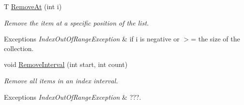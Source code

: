 \begin{DoxyCompactItemize}
T \hyperlink{class_c5_1_1_sorted_array_a901cec8ac5a0a876476285ae7dd3e7e2}{Remove\+At} (int i)
\begin{DoxyCompactList}\small\item\em Remove the item at a specific position of the list. 
\begin{DoxyExceptions}{Exceptions}
{\em Index\+Out\+Of\+Range\+Exception} & if i is negative or $>$= the size of the collection. \\
\hline
\end{DoxyExceptions}
\end{DoxyCompactList}\item 
void \hyperlink{class_c5_1_1_sorted_array_a277e0cf59b483ba0378d6ec0f240ecef}{Remove\+Interval} (int start, int count)
\begin{DoxyCompactList}\small\item\em Remove all items in an index interval. 
\begin{DoxyExceptions}{Exceptions}
{\em Index\+Out\+Of\+Range\+Exception} & ???. \\
\hline
\end{DoxyExceptions}
\end{DoxyCompactList}\end{DoxyCompactItemize}
